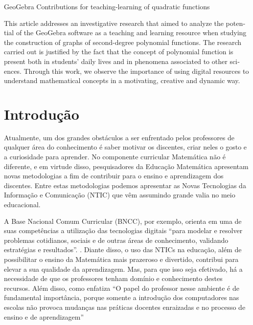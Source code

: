 \begin{refsection}
    
    \begin{otherlanguage}{english}
    
    \fakeChapterOneLine
    {GeoGebra Contributions for teaching\-{}-learning of quadratic functions}
    
    \begin{galoResumo}[Abstract]
        This article addresses an investigative research that aimed to analyze the potential of the GeoGebra software as a teaching and learning resource when studying the construction of graphs of second-degree polynomial functions. The research carried out is justified by the fact that the concept of polynomial function is present both in students' daily lives and in phenomena associated to other sciences. Through this work, we observe the importance of using digital resources to understand mathematical concepts in a motivating, creative and dynamic way.
    \end{galoResumo}
    
    \end{otherlanguage}
    

    \section{Introdução}

    Atualmente, um dos grandes obstáculos a ser enfrentado pelos professores de qualquer área do conhecimento é saber motivar os discentes, criar neles o gosto e a curiosidade para aprender. No componente curricular Matemática não é diferente, e em virtude disso, pesquisadores da Educação Matemática apresentam novas metodologias a fim de contribuir para o ensino e aprendizagem dos discentes. Entre estas metodologias podemos apresentar as Novas Tecnologias da Informação e Comunicação (NTIC) que vêm assumindo grande valia no meio educacional.  

    A Base Nacional Comum Curricular (BNCC), por exemplo, orienta em uma de suas competências a utilização das tecnologias digitais “para modelar e resolver problemas cotidianos, sociais e de outras áreas de conhecimento, validando estratégias e resultados”. \cite[p.~267]{DocumentoInstitucional2016Base}. Diante disso, o uso das NTICs na educação, além de possibilitar o ensino da Matemática mais prazeroso e divertido, contribui para elevar a sua qualidade da aprendizagem. Mas, para que isso seja efetivado, há a necessidade de que os professores tenham domínio e conhecimento destes recursos.  Além disso, como enfatiza \textcite[p.~102]{CARNEIROAndoAndPASSOS2014utilização} “O papel do professor nesse ambiente é de fundamental importância, porque somente a introdução dos computadores nas escolas não provoca mudanças nas práticas docentes enraizadas e no processo de ensino e de aprendizagem” 


\end{refsection}
